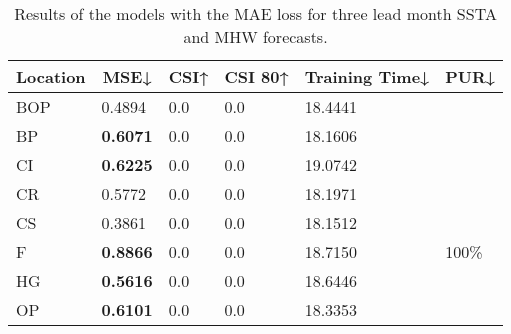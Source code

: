 \documentclass[11pt, a4paper]{article}
\begin{document}
\begin{table}[H]
\centering
\small
\caption{Results of the models with the MAE loss for three lead month SSTA and MHW forecasts.}
\begin{tabular}{llllll}
\multicolumn{1}{c}{\textbf{Location}} & \multicolumn{1}{c}{\textbf{MSE↓}} & \multicolumn{1}{c}{\textbf{CSI↑}} & \multicolumn{1}{c}{\textbf{CSI 80↑}} & \multicolumn{1}{c}{\textbf{Training Time↓}} & \multicolumn{1}{c}{\textbf{PUR↓}} \\ \hline
BOP                         & 0.4894                            & 0.0                               & 0.0                                  & 18.4441                                     &                                   \\
BP                        & \textbf{0.6071}                   & 0.0                               & 0.0                                  & 18.1606                                     &                                   \\
CI                        & \textbf{0.6225}                   & 0.0                               & 0.0                                  & 19.0742                                     &                                   \\
CR                           & 0.5772                            & 0.0                               & 0.0                                  & 18.1971                                     &                                   \\
CS                           & 0.3861                            & 0.0                               & 0.0                                  & 18.1512                                     &                                   \\
F                             & \textbf{0.8866}                   & 0.0                               & 0.0                                  & 18.7150                                     & 100\%                             \\
HG                          & \textbf{0.5616}                   & 0.0                               & 0.0                                  & 18.6446                                     &                                   \\
OP                       & \textbf{0.6101}                   & 0.0                               & 0.0                                  & 18.3353                                     &                                   \\

\end{tabular}
\end{table}
\end{document}
